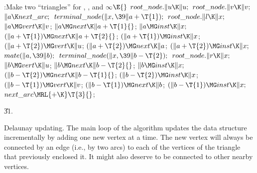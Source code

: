\B{}:Make two ``triangles'' for , , and $\infty$\X${}%
\E{}$\6
$\\{root\_node}.\|u\K\|u;{}$\6
${}\\{root\_node}.\|v\K\|v;{}$\6
${}\|a\K\\{next\_arc};{}$\6
${}\\{terminal\_node}(\|x,\39\|a+\T{1});{}$\6
${}\\{root\_node}.\|l\K\|x;{}$\6
${}\|a\MG\\{vert}\K\|v{}$;\5
${}\|a\MG\\{next}\K\|a+\T{1}{}$;\5
${}\|a\MG\\{inst}\K\|x;{}$\6
${}(\|a+\T{1})\MG\\{next}\K\|a+\T{2}{}$;\5
${}(\|a+\T{1})\MG\\{inst}\K\|x{}$;\6
${}(\|a+\T{2})\MG\\{vert}\K\|u{}$;\5
${}(\|a+\T{2})\MG\\{next}\K\|a{}$;\5
${}(\|a+\T{2})\MG\\{inst}\K\|x;{}$\6
${}\\{mate}(\|a,\39\|b);{}$\6
${}\\{terminal\_node}(\|x,\39\|b-\T{2});{}$\6
${}\\{root\_node}.\|r\K\|x;{}$\6
${}\|b\MG\\{vert}\K\|u{}$;\5
${}\|b\MG\\{next}\K\|b-\T{2}{}$;\5
${}\|b\MG\\{inst}\K\|x;{}$\6
${}(\|b-\T{2})\MG\\{next}\K\|b-\T{1}{}$;\5
${}(\|b-\T{2})\MG\\{inst}\K\|x{}$;\6
${}(\|b-\T{1})\MG\\{vert}\K\|v{}$;\5
${}(\|b-\T{1})\MG\\{next}\K\|b{}$;\5
${}(\|b-\T{1})\MG\\{inst}\K\|x;{}$\6
${}\\{next\_arc}\MRL{+{\K}}\T{3}{}$;\par
\U31.\fi

Delaunay updating.
The main loop of the algorithm updates the data structure incrementally
by adding one new vertex at a time. The new vertex will always be connected
by an edge (i.e., by two arcs) to each of the vertices of the triangle that
previously enclosed it. It might also deserve to be connected to other
nearby vertices.

